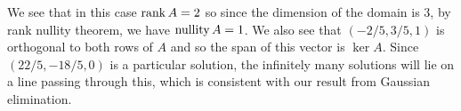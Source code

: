 \documentclass[../main.tex]{subfiles}
\begin{document}
\begin{example}
  We see that in this case $\operatorname{rank} A = 2$ so since the dimension of the domain is $3$, by rank nullity theorem, we have $\operatorname{nullity} A = 1$.
  We also see that $(-2/5, 3/5, 1)$ is orthogonal to both rows of $A$ and so the span of this vector is $\ker A$.
  Since $(22/5, -18/5, 0)$ is a particular solution, the infinitely many solutions will lie on a line passing through this, which is consistent with our result from Gaussian elimination.
\end{example}
\end{document}
